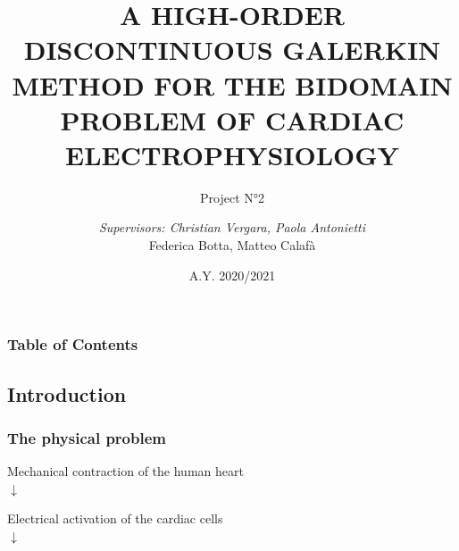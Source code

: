 \documentclass{beamer}
\title[\color{white}{Project N°2}]{A HIGH-ORDER DISCONTINUOUS GALERKIN METHOD FOR THE BIDOMAIN PROBLEM OF CARDIAC ELECTROPHYSIOLOGY}
\subtitle{Project N°2}
\author[]{\small{\textit{Supervisors: Christian Vergara, Paola Antonietti}}\\ \vspace{5mm} Federica Botta, Matteo Calafà}
\institute[Politecnico di Milano]{Course of Numerical Analysis for Partial Differential Equations}
\date{A.Y. 2020/2021}
\begin{document}
\frame{\titlepage}

\begin{frame}
\frametitle{Table of Contents}
\tableofcontents
\end{frame}

\begin{frame}
\section{Introduction}
\frametitle{The physical problem}
\begin{center}
Mechanical contraction of the human heart\\

$\downarrow$

Electrical activation of the cardiac cells\\

$\downarrow$


\end{center}
\end{frame}
\end{document}
